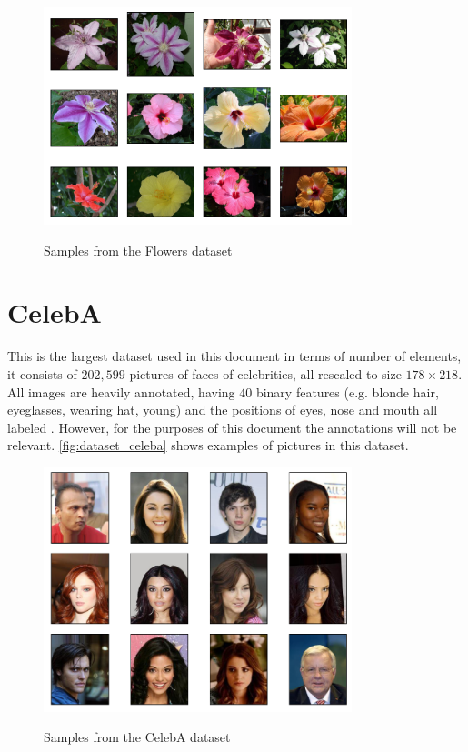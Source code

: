 \begin{figure} [hbt]
    \centering
    \caption{Samples from the Flowers dataset}
    \includegraphics[width=0.8\textwidth]{chapters/Datasets/figures/Flowers.pdf}
    \label{fig:dataset_flowers}
\end{figure}

\section{CelebA} \label{sec:celebA}
This is the largest dataset used in this document in terms of number of elements, it consists of $202,599$ pictures of faces of celebrities, all rescaled to size $178\times218$. All images are heavily annotated, having $40$ binary features (e.g. blonde hair, eyeglasses, wearing hat, young) and the positions of eyes, nose and mouth all labeled \cite{celebA2015}. However, for the purposes of this document the annotations will not be relevant. \autoref{fig:dataset_celeba} shows examples of pictures in this dataset.
\begin{figure}
    \centering
    \caption{Samples from the CelebA dataset}
    \includegraphics[width=0.8\textwidth]{chapters/Datasets/figures/CelebA.pdf}
    \label{fig:dataset_celeba}
\end{figure}
